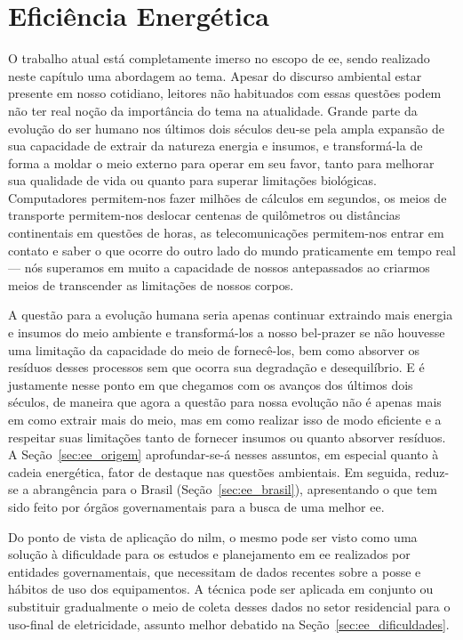 \chapter{Eficiência Energética}
\label{chap:ee}
\glsresetall

O trabalho atual está completamente imerso no escopo de \gls{ee},
sendo realizado neste capítulo uma abordagem ao tema. Apesar do
discurso ambiental estar presente em nosso cotidiano, leitores não
habituados com essas questões podem não ter real noção da importância
do tema na atualidade. Grande parte da evolução do ser humano nos
últimos dois séculos deu-se pela ampla expansão de sua capacidade de
extrair da natureza energia e insumos, e transformá-la de
forma a moldar o meio externo para operar em seu favor, tanto para
melhorar sua qualidade de vida ou quanto para superar limitações
biológicas. Computadores permitem-nos fazer milhões de cálculos em
segundos, os meios de transporte permitem-nos deslocar centenas de
quilômetros ou distâncias continentais em questões de horas, as
telecomunicações permitem-nos entrar em contato e saber o que ocorre
do outro lado do mundo praticamente em tempo real --- nós superamos em
muito a capacidade de nossos antepassados ao criarmos meios de
transcender as limitações de nossos corpos.

A questão para a evolução humana seria apenas continuar extraindo mais
energia e insumos do meio ambiente e transformá-los a nosso bel-prazer
se não houvesse uma limitação da capacidade do meio de fornecê-los,
bem como absorver os resíduos desses processos sem que ocorra sua
degradação e desequilíbrio. E é justamente nesse ponto em que chegamos
com os avanços dos últimos dois séculos, de maneira que agora a
questão para nossa evolução não é apenas mais em como extrair mais do
meio, mas em como realizar isso de modo eficiente e a respeitar suas
limitações tanto de fornecer insumos ou quanto absorver resíduos. A
Seção~\ref{sec:ee_origem} aprofundar-se-á nesses assuntos, em especial
quanto à cadeia energética, fator de destaque nas questões ambientais.
Em seguida, reduz-se a abrangência para o Brasil
(Seção~\ref{sec:ee_brasil}), apresentando o que tem sido feito por
órgãos governamentais para a busca de uma melhor \gls{ee}.

Do ponto de vista de aplicação do \acs{nilm}, o mesmo pode ser
visto como uma solução à dificuldade para os estudos e planejamento
em \gls{ee} realizados por entidades governamentais, que
necessitam de dados recentes sobre a posse e hábitos de uso dos
equipamentos. A técnica pode ser aplicada em conjunto ou substituir
gradualmente o meio de coleta desses dados no setor residencial para o
uso-final de eletricidade, assunto melhor debatido na
Seção~\ref{sec:ee_dificuldades}.

